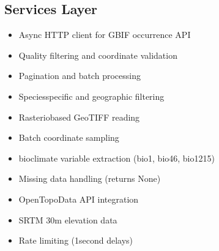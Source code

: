 \documentclass[letterpaper,10pt,english]{sphinxmanual}
\begin{document}
\subsection{Services Layer}
\label{\detokenize{architecture:services-layer}}\begin{description}
\begin{itemize}
\item {} 
\sphinxAtStartPar
Async HTTP client for GBIF occurrence API

\item {} 
\sphinxAtStartPar
Quality filtering and coordinate validation

\item {} 
\sphinxAtStartPar
Pagination and batch processing

\item {} 
\sphinxAtStartPar
Species\sphinxhyphen{}specific and geographic filtering

\end{itemize}

\begin{itemize}
\item {} 
\sphinxAtStartPar
Rasterio\sphinxhyphen{}based GeoTIFF reading

\item {} 
\sphinxAtStartPar
Batch coordinate sampling

\item {} 
 bioclimate variable extraction (bio1, bio4\sphinxhyphen{}6, bio12\sphinxhyphen{}15)

\item {} 
\sphinxAtStartPar
Missing data handling (returns None)

\end{itemize}

\begin{itemize}
\item {} 
\sphinxAtStartPar
Open\sphinxhyphen{}Topo\sphinxhyphen{}Data API integration

\item {} 
\sphinxAtStartPar
SRTM 30m elevation data

\item {} 
\sphinxAtStartPar
Rate limiting (1\sphinxhyphen{}second delays)


\end{itemize}
\end{description}
\end{document}
